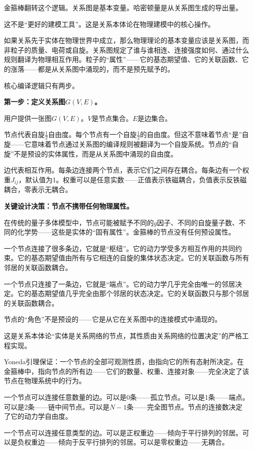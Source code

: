 \documentclass[11pt,a4paper]{book}
\theoremstyle{definition}
\begin{document}
金箍棒翻转这个逻辑。关系图是基本变量。哈密顿量是从关系图生成的导出量。

这不是“更好的建模工具”。这是关系本体论在物理建模中的核心操作。

如果关系先于实体在物理世界中成立，那么物理理论的基本变量应该是关系图，而非粒子的质量、电荷或自旋。关系图规定了谁与谁相连、连接强度如何、通过什么规则翻译为物理相互作用。粒子的“属性”——它的基态期望值、它的关联函数、它的涨落——都是从关系图中涌现的，而不是预先赋予的。

核心编译逻辑只有两步。

\textbf{第一步：定义关系图$G(V,E)$。}

用户提供一张图$G(V,E)$。$V$是节点集合。$E$是边集合。

节点代表自旋$\frac{1}{2}$自由度。每个节点有一个自旋$\frac{1}{2}$的自由度。但这不意味着节点“是”自旋——它意味着节点通过关系图的编译规则被翻译为一个自旋系统。节点的“自旋”不是预设的实体属性，而是从关系图中涌现的自由度。

边代表相互作用。每条边连接两个节点，表示它们之间存在耦合。每条边有一个权重$J_{ij}$，默认值为1。权重可以是任意实数——正值表示铁磁耦合，负值表示反铁磁耦合，零表示无耦合。

\textbf{关键设计决策：节点不携带任何物理属性。}

在传统的量子多体模型中，节点可能被赋予不同的$g$因子、不同的自旋量子数、不同的化学势——这些是实体的“固有属性”。金箍棒的节点没有任何预设属性。

一个节点连接了很多条边，它就是“枢纽”。它的动力学受多方相互作用的共同约束。它的基态期望值由所有与它相连的自旋的集体状态决定。它的关联函数与所有邻居的关联函数耦合。

一个节点只连接了一条边，它就是“端点”。它的动力学几乎完全由唯一的邻居决定。它的基态期望值几乎完全由那个邻居的状态决定。它的关联函数只与那个邻居的关联函数耦合。

节点的“角色”不是预设的——它是从它在关系图中的连接模式中涌现的。

这是关系本体论“实体是关系网络的节点，其性质由关系网络的位置决定”的严格工程实现。

Yoneda引理保证：一个节点的全部可观测性质，由指向它的所有态射所决定。在金箍棒中，指向节点的所有边——它们的数量、权重、连接对象——完全决定了该节点在物理系统中的行为。

一个节点可以连接任意数量的边。可以是0条——孤立节点。可以是1条——端点。可以是2条——链中间节点。可以是$N-1$条——完全图节点。节点的连接数决定了它的动力学自由度。

一个节点可以连接任意类型的边。可以是正权重边——倾向于平行排列的邻居。可以是负权重边——倾向于反平行排列的邻居。可以是零权重边——无耦合。
\end{document}
